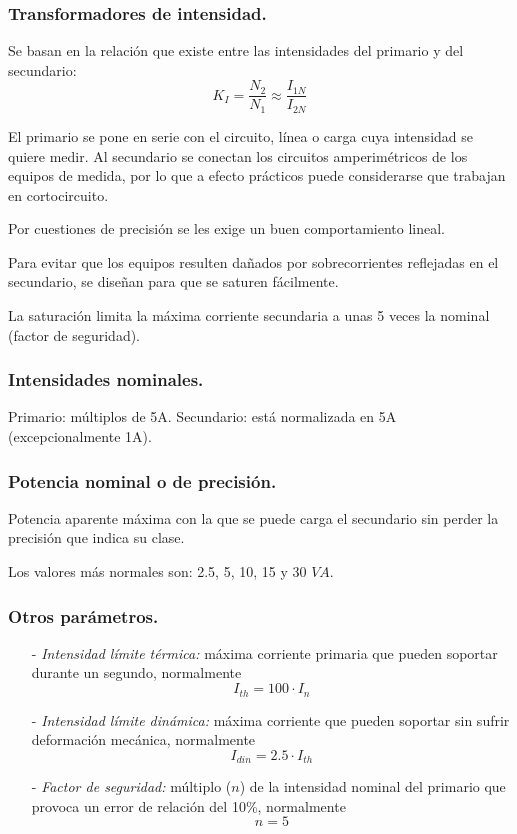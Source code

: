 			
		\subsubsection{Transformadores de intensidad.}
			Se basan en la relación que existe entre las intensidades
			del primario y del secundario:
			\[K_I=\dfrac{N_2}{N_1} \approx \dfrac{I_{1N}}{I_{2N}}\]
			
			
			El primario se pone en serie con el circuito, línea o carga
			cuya intensidad se quiere medir. Al secundario se conectan los circuitos amperimétricos
			de los equipos de medida, por lo que a efecto prácticos puede considerarse que trabajan en cortocircuito.
			
			
			Por cuestiones de precisión se les exige un buen
			comportamiento lineal. 
			
			
			Para evitar que los equipos resulten dañados por
			sobrecorrientes reflejadas en el secundario, se diseñan
			para que se saturen fácilmente.
			
			
			La saturación limita la máxima corriente secundaria a
			unas 5 veces la nominal (factor de seguridad).
			
			\subsubsection*{Intensidades nominales.}
				Primario: múltiplos de 5A. Secundario: está normalizada
				en 5A (excepcionalmente 1A).
				
			\subsubsection*{Potencia nominal o de precisión.}
				Potencia aparente máxima con la que se puede carga el
				secundario sin perder la precisión que indica su clase.
				
				
				Los valores más normales son: 2.5, 5, 10, 15 y 30 $VA$.
				
			\subsubsection*{Otros parámetros.}
				\begin{itemize}
					\item[-] \textit{Intensidad límite térmica:} máxima corriente primaria
					que pueden soportar durante un segundo, normalmente
					\[I_{th} = 100 \cdot I_n\]
					\item[-] \textit{Intensidad límite dinámica:} máxima corriente que
					pueden soportar sin sufrir deformación mecánica, normalmente
					\[I_{din}= 2.5 \cdot I_{th}\]
					\item[-] \textit{Factor de seguridad:} múltiplo ($n$) de la intensidad
					nominal del primario que provoca un error de relación
					del 10\%, normalmente
					\[n=5\]
				\end{itemize}
				
